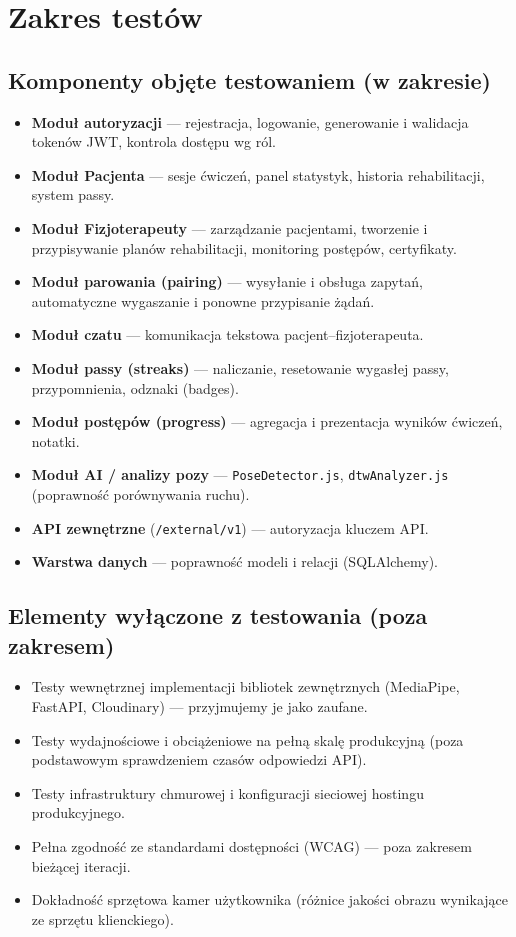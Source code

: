 \documentclass[11pt,a4paper]{article}
\begin{document}
\section{Zakres testów}

\subsection{Komponenty objęte testowaniem (w zakresie)}
\begin{itemize}
  \item \textbf{Moduł autoryzacji} — rejestracja, logowanie, generowanie i walidacja tokenów JWT, kontrola dostępu wg ról.
  \item \textbf{Moduł Pacjenta} — sesje ćwiczeń, panel statystyk, historia rehabilitacji, system passy.
  \item \textbf{Moduł Fizjoterapeuty} — zarządzanie pacjentami, tworzenie i przypisywanie planów rehabilitacji, monitoring postępów, certyfikaty.
  \item \textbf{Moduł parowania (pairing)} — wysyłanie i obsługa zapytań, automatyczne wygaszanie i ponowne przypisanie żądań.
  \item \textbf{Moduł czatu} — komunikacja tekstowa pacjent–fizjoterapeuta.
  \item \textbf{Moduł passy (streaks)} — naliczanie, resetowanie wygasłej passy, przypomnienia, odznaki (badges).
  \item \textbf{Moduł postępów (progress)} — agregacja i prezentacja wyników ćwiczeń, notatki.
  \item \textbf{Moduł AI / analizy pozy} — \texttt{PoseDetector.js}, \texttt{dtwAnalyzer.js} (poprawność porównywania ruchu).
  \item \textbf{API zewnętrzne} (\texttt{/external/v1}) — autoryzacja kluczem API.
  \item \textbf{Warstwa danych} — poprawność modeli i relacji (SQLAlchemy).
\end{itemize}

\subsection{Elementy wyłączone z testowania (poza zakresem)}
\begin{itemize}
  \item Testy wewnętrznej implementacji bibliotek zewnętrznych (MediaPipe, FastAPI, Cloudinary) — przyjmujemy je jako zaufane.
  \item Testy wydajnościowe i obciążeniowe na pełną skalę produkcyjną (poza podstawowym sprawdzeniem czasów odpowiedzi API).
  \item Testy infrastruktury chmurowej i konfiguracji sieciowej hostingu produkcyjnego.
  \item Pełna zgodność ze standardami dostępności (WCAG) — poza zakresem bieżącej iteracji.
  \item Dokładność sprzętowa kamer użytkownika (różnice jakości obrazu wynikające ze sprzętu klienckiego).
\end{itemize}
\end{document}
